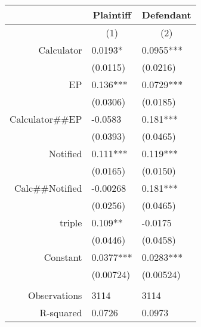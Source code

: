 \begin{tabular}{rrr}
\toprule
      & \multicolumn{1}{c}{Plaintiff } & \multicolumn{1}{c}{Defendant} \\
\midrule
      & \multicolumn{1}{c}{(1)} & \multicolumn{1}{c}{(2)} \\
      \midrule
      \midrule
Calculator & \multicolumn{1}{l}{0.0193*} & \multicolumn{1}{l}{0.0955***} \\
      & \multicolumn{1}{l}{(0.0115)} & \multicolumn{1}{l}{(0.0216)} \\
EP    & \multicolumn{1}{l}{0.136***} & \multicolumn{1}{l}{0.0729***} \\
      & \multicolumn{1}{l}{(0.0306)} & \multicolumn{1}{l}{(0.0185)} \\
Calculator\#\#EP & \multicolumn{1}{l}{-0.0583} & \multicolumn{1}{l}{0.181***} \\
      & \multicolumn{1}{l}{(0.0393)} & \multicolumn{1}{l}{(0.0465)} \\
Notified & \multicolumn{1}{l}{0.111***} & \multicolumn{1}{l}{0.119***} \\
      & \multicolumn{1}{l}{(0.0165)} & \multicolumn{1}{l}{(0.0150)} \\
Calc\#\#Notified & \multicolumn{1}{l}{-0.00268} & \multicolumn{1}{l}{0.181***} \\
      & \multicolumn{1}{l}{(0.0256)} & \multicolumn{1}{l}{(0.0465)} \\
triple & \multicolumn{1}{l}{0.109**} & \multicolumn{1}{l}{-0.0175} \\
      & \multicolumn{1}{l}{(0.0446)} & \multicolumn{1}{l}{(0.0458)} \\
Constant & \multicolumn{1}{l}{0.0377***} & \multicolumn{1}{l}{0.0283***} \\
      & \multicolumn{1}{l}{(0.00724)} & \multicolumn{1}{l}{(0.00524)} \\
      & \multicolumn{1}{l}{} & \multicolumn{1}{l}{} \\
      \midrule
Observations & \multicolumn{1}{l}{3114} & \multicolumn{1}{l}{3114} \\
R-squared & \multicolumn{1}{l}{0.0726} & \multicolumn{1}{l}{0.0973} \\
\bottomrule
\end{tabular}%
